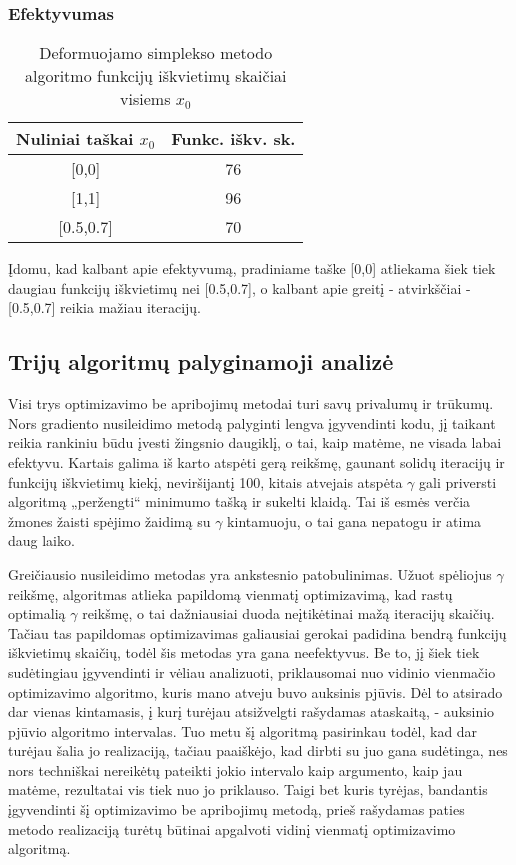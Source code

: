 \documentclass{article}
\begin{document}
\subsubsection{Efektyvumas}
\begin{table}[H]
    \centering
    \begin{tabular}{|c|c|} 
    \hline
    Nuliniai taškai $x_{0}$ & Funkc. iškv. sk.  \\ 
    \hline
    {[}0,0]            & 76                \\ 
    \hline
    {[}1,1]            & 96                \\ 
    \hline
    {[}0.5,0.7]        & 70                \\
    \hline
    \end{tabular}
    \caption{Deformuojamo simplekso metodo algoritmo funkcijų iškvietimų skaičiai visiems $x_{0}$}
    \label{table:9}
\end{table}
Įdomu, kad kalbant apie efektyvumą, pradiniame taške [0,0] atliekama šiek tiek daugiau funkcijų iškvietimų nei [0.5,0.7], o kalbant apie greitį - atvirkščiai - [0.5,0.7] reikia mažiau iteracijų.
\subsection{Trijų algoritmų palyginamoji analizė}
Visi trys optimizavimo be apribojimų metodai turi savų privalumų ir trūkumų. Nors gradiento nusileidimo metodą palyginti lengva įgyvendinti kodu, jį taikant reikia rankiniu būdu įvesti žingsnio daugiklį, o tai, kaip matėme, ne visada labai efektyvu. Kartais galima iš karto atspėti gerą reikšmę, gaunant solidų iteracijų ir funkcijų iškvietimų kiekį, neviršijantį 100, kitais atvejais atspėta $\gamma$ gali priversti algoritmą „peržengti“ minimumo tašką ir sukelti klaidą. Tai iš esmės verčia žmones žaisti spėjimo žaidimą su $\gamma$ kintamuoju, o tai gana nepatogu ir atima daug laiko. 

Greičiausio nusileidimo metodas yra ankstesnio patobulinimas. Užuot spėliojus $\gamma$ reikšmę, algoritmas atlieka papildomą vienmatį optimizavimą, kad rastų optimalią $\gamma$ reikšmę, o tai dažniausiai duoda neįtikėtinai mažą iteracijų skaičių. Tačiau tas papildomas optimizavimas galiausiai gerokai padidina bendrą funkcijų iškvietimų skaičių, todėl šis metodas yra gana neefektyvus. Be to, jį šiek tiek sudėtingiau įgyvendinti ir vėliau analizuoti, priklausomai nuo vidinio vienmačio optimizavimo algoritmo, kuris mano atveju buvo auksinis pjūvis. Dėl to atsirado dar vienas kintamasis, į kurį turėjau atsižvelgti rašydamas ataskaitą, - auksinio pjūvio algoritmo intervalas. Tuo metu šį algoritmą pasirinkau todėl, kad dar turėjau šalia jo realizaciją, tačiau paaiškėjo, kad dirbti su juo gana sudėtinga, nes nors techniškai nereikėtų pateikti jokio intervalo kaip argumento, kaip jau matėme, rezultatai vis tiek nuo jo priklauso. Taigi bet kuris tyrėjas, bandantis įgyvendinti šį optimizavimo be apribojimų metodą, prieš rašydamas paties metodo realizaciją turėtų būtinai apgalvoti vidinį vienmatį optimizavimo algoritmą.
\end{document}
